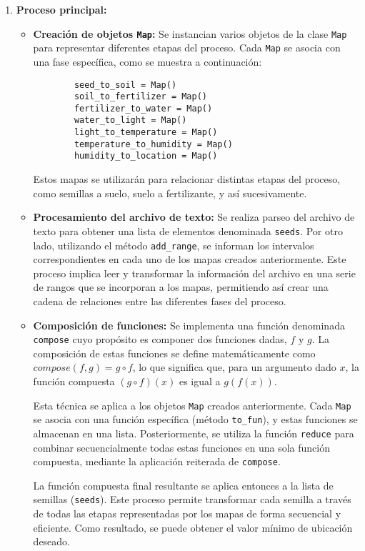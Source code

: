 \documentclass[a4paper,12pt]{article}
\begin{document}
\begin{enumerate}
    \item \textbf{Proceso principal:}
    \begin{itemize}
        \item \textbf{Creación de objetos \lstinline{Map}:}
        Se instancian varios objetos de la clase \lstinline{Map} para representar diferentes etapas del proceso. Cada \lstinline{Map} se asocia con una fase específica, como se muestra a continuación:
        \begin{lstlisting}
        seed_to_soil = Map()
        soil_to_fertilizer = Map()
        fertilizer_to_water = Map()
        water_to_light = Map()
        light_to_temperature = Map()
        temperature_to_humidity = Map()
        humidity_to_location = Map()
        \end{lstlisting}
        Estos mapas se utilizarán para relacionar distintas etapas del proceso, como semillas a suelo, suelo a fertilizante, y así sucesivamente.
    
        \item \textbf{Procesamiento del archivo de texto:}
        Se realiza parseo del archivo de texto para obtener una lista de elementos denominada \lstinline{seeds}. Por otro lado, utilizando el método \lstinline{add_range}, se informan los intervalos correspondientes en cada uno de los mapas creados anteriormente. Este proceso implica leer y transformar la información del archivo en una serie de rangos que se incorporan a los mapas, permitiendo así crear una cadena de relaciones entre las diferentes fases del proceso.

        \item \textbf{Composición de funciones:}
        Se implementa una función denominada \lstinline{compose} cuyo propósito es componer dos funciones dadas, $f$ y $g$. La composición de estas funciones se define matemáticamente como $compose(f, g) = g \circ f$, lo que significa que, para un argumento dado $x$, la función compuesta $(g \circ f)(x)$ es igual a $g(f(x))$.
    
        Esta técnica se aplica a los objetos \lstinline{Map} creados anteriormente. Cada \lstinline{Map} se asocia con una función específica (método \lstinline{to_fun}), y estas funciones se almacenan en una lista. Posteriormente, se utiliza la función \lstinline{reduce} para combinar secuencialmente todas estas funciones en una sola función compuesta, mediante la aplicación reiterada de \lstinline{compose}.
    
        La función compuesta final resultante se aplica entonces a la lista de semillas (\lstinline{seeds}). Este proceso permite transformar cada semilla a través de todas las etapas representadas por los mapas de forma secuencial y eficiente. Como resultado, se puede obtener el valor mínimo de ubicación deseado.        
    \end{itemize}
        
\end{enumerate}
\end{document}
